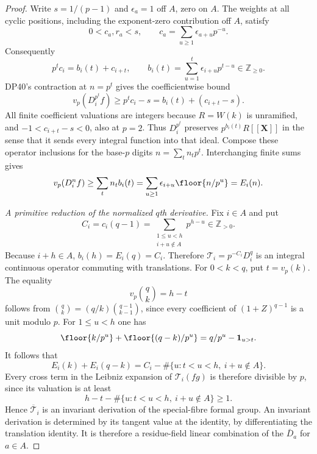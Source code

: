 \documentclass[11pt,a4paper]{article}
\theoremstyle{definition}\newtheorem{remark}[theorem]{Remark}
\newcommand{\Z}{\mathbb Z}\newcommand{\Q}{\mathbb Q}\newcommand{\F}{\mathbb F}
\newcommand{\mathscr}[1]{\mathcal{#1}}
\newcommand{\vp}{v_p}\newcommand{\dR}{\mathrm{dR}}\newcommand{\crys}{\mathrm{crys}}
\begin{document}
\begin{proof}
Write $s=1/(p-1)$ and $\epsilon_a=1$ off $A$, zero on $A$. The weights at all cyclic positions, including the exponent-zero contribution off $A$, satisfy
\[
 0<c_a,r_a<s,\qquad
 c_a=\sum_{u\ge1}\epsilon_{a+u}p^{-u}.
\]
Consequently
\[
 p^tc_i=b_i(t)+c_{i+t},\qquad
 b_i(t)=\sum_{u=1}^t\epsilon_{i+u}p^{t-u}\in\Z_{\ge0}.
\]
DP40's contraction at $n=p^t$ gives the coefficientwise bound
\[
 \vp(D_i^{p^t}f)\ge p^tc_i-s=b_i(t)+(c_{i+t}-s).
\]
All finite coefficient valuations are integers because $R=W(k)$ is unramified, and $-1<c_{i+t}-s<0$, also at $p=2$.
Thus $D_i^{p^t}$ preserves $p^{b_i(t)}R[[\mathbf X]]$ in the sense that it sends every integral function into that ideal. Compose these operator inclusions for the base-$p$ digits $n=\sum_tn_tp^t$. Interchanging finite sums gives
\[
 \vp(D_i^nf)\ge\sum_tn_tb_i(t)
       =\sum_{u\ge1}\epsilon_{i+u}\floor{n/p^u}=E_i(n).
\]

\emph{A primitive reduction of the normalized $q$th derivative.}
Fix $i\in A$ and put
\[
 C_i=c_i(q-1)=
       \sum_{\substack{1\le u<h\\i+u\notin A}}p^{h-u}\in\Z_{>0}.
\]
Because $i+h\in A$, $b_i(h)=E_i(q)=C_i$. Therefore
$\mathscr T_i=p^{-C_i}D_i^q$ is an integral continuous operator commuting with translations.
For $0<k<q$, put $t=\vp(k)$.
The equality
\[
 \vp\binom qk=h-t
\]
follows from $\binom qk=(q/k)\binom{q-1}{k-1}$, since every coefficient of
$(1+Z)^{q-1}$ is a unit modulo $p$.
For $1\le u<h$ one has
\[
 \floor{k/p^u}+\floor{(q-k)/p^u}
       =q/p^u-\mathbf1_{u>t}.
\]
It follows that
\[
 E_i(k)+E_i(q-k)
       =C_i-\#\{u:t<u<h,\ i+u\notin A\}.
\]
Every cross term in the Leibniz expansion of $\mathscr T_i(fg)$ is therefore divisible by $p$, since its valuation is at least
\[
 h-t-\#\{u:t<u<h,\ i+u\notin A\}\ge1.
\]
Hence $\overline{\mathscr T}_i$ is an invariant derivation of the special-fibre formal group. An invariant derivation is determined by its tangent value at the identity, by differentiating the translation identity. It is therefore a residue-field linear combination of the $\bar D_a$ for $a\in A$.


\end{proof}
\end{document}

